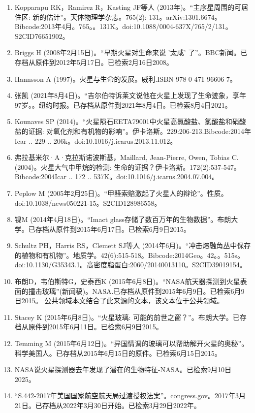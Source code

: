 \begin{enumerate}
\item Kopparapu RK，Ramirez R，Kasting JF等人 (2013年)。“主序星周围的可居住区: 新的估计”。天体物理学杂志。765(2): 131。arXiv:1301.6674。Bibcode:2013年4月。765。。131K。doi:10.1088/0004-637X/765/2/131。S2CID76651902。 
\item Briggs H (2008年2月15日)。“早期火星对生命来说 '太咸' 了”。BBC新闻。已存档从原件到2012年5月17日。已检索2月16日2008。
\item Hannsson A (1997)。火星与生命的发展。威利.ISBN 978-0-471-96606-7。
\item 张凯 (2021年8月4日)。“吉尔伯特诉莱文说他在火星上发现了生命迹象，享年97岁。。纽约时报。已存档从原件到2021年8月4日。已检索8月4日2021。
\item Kounaves SP (2014)。“火星陨石EETA79001中火星高氯酸盐、氯酸盐和硝酸盐的证据: 对氧化剂和有机物的影响”。伊卡洛斯。229:206-213.Bibcode:2014年Icar .. 229 .. 206k。doi:10.1016/j.icarus.2013.11.012。
\item 弗拉基米尔·A·克拉斯诺波斯基，Maillard, Jean-Pierre, Owen, Tobias C.(2004)。火星大气中甲烷的检测: 生命的证据？伊卡洛斯。172(2):537-547。Bibcode:2004Icar .. 172 .. 537K。doi:10.1016/j.icarus.2004.07.004。
\item Peplow M (2005年2月25日)。“甲醛索赔激起了火星人的辩论”。性质。doi:10.1038/news050221-15。S2CID128986558。 
\item 镍M (2014年4月18日)。“Imact glass存储了数百万年的生物数据”。布朗大学。已存档从原件到2015年6月17日。已检索6月9日2015。
\item Schultz PH，Harris RS，Clemett SJ等人 (2014年6月)。“冲击熔融角丛中保存的植物和有机物”。地质学。42(6):515-518。Bibcode:2014Geo。42。。515s。doi:10.1130/G35343.1。高密度脂蛋白:2060/20140013110。S2CID39019154。 
\item 布朗D，韦伯斯特G，史泰西K (2015年6月8日)。“NASA航天器探测到火星表面的撞击玻璃”(新闻稿)。NASA.已存档从原件到2015年6月9日。已检索6月9日2015。 公共领域本文结合了此来源的文本，该文本位于公共领域。
\item Stacey K (2015年6月8日)。“火星玻璃: 可能的前世之窗？”。布朗大学。已存档从原件到2015年6月11日。已检索6月9日2015。
\item Temming M (2015年6月12日)。“异国情调的玻璃可以帮助解开火星的奥秘”。科学美国人。已存档从2015年6月15日的原件。已检索6月15日2015。
\item NASA说火星探测器去年发现了潜在的生物特征-NASA。已检索9月10日2025。
\item “S.442-2017年美国国家航空航天局过渡授权法案”。congress.gov。2017年3月21日。已存档从2022年3月30日开始。已检索3月29日2022年。

\end{enumerate}
